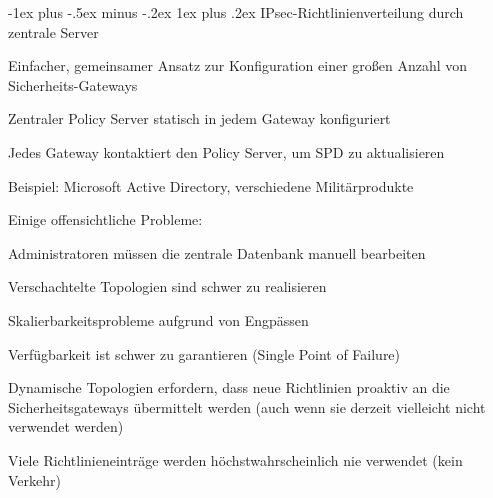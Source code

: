 \documentclass[a4paper]{article}
\makeatletter
\renewcommand{\subsubsection}{\@startsection{subsubsection}{3}{0mm}%
 {-1ex plus -.5ex minus -.2ex}%
 {1ex plus .2ex}%
 {\normalfont\small\bfseries}}
\makeatother
\begin{document}
\begin{multicols}{3}
\begin{itemize*}
            \subsubsection{IPsec-Richtlinienverteilung durch zentrale
                  Server}
            \begin{itemize*}
                  \item Einfacher, gemeinsamer Ansatz zur Konfiguration einer großen Anzahl
                  von Sicherheits-Gateways
                  \item Zentraler Policy Server statisch in jedem Gateway konfiguriert
                  \item Jedes Gateway kontaktiert den Policy Server, um SPD zu aktualisieren
                  \item Beispiel: Microsoft Active Directory, verschiedene Militärprodukte
                  \item Einige offensichtliche Probleme:
                  \begin{itemize*}
                        \item Administratoren müssen die zentrale Datenbank manuell bearbeiten
                        \item Verschachtelte Topologien sind schwer zu realisieren
                        \item Skalierbarkeitsprobleme aufgrund von Engpässen
                        \item Verfügbarkeit ist schwer zu garantieren (Single Point of Failure)
                        \item Dynamische Topologien erfordern, dass neue Richtlinien proaktiv an die Sicherheitsgateways übermittelt werden (auch wenn sie derzeit vielleicht nicht verwendet werden)
                        \item Viele Richtlinieneinträge werden höchstwahrscheinlich nie verwendet (kein Verkehr)
                  \end{itemize*}
            \end{itemize*}


\end{itemize*}
\end{multicols}
\end{document}

